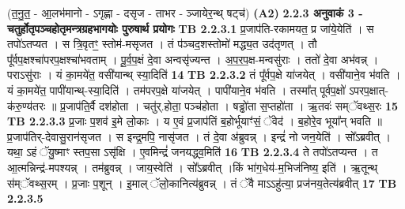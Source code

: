 \documentclass[17pt]{extarticle}
\begin{document}
                  \newline
                                    (त॒नु॒त॒ - आ॒लभ॑मानो - ऽगृह्णा - दसृज - ताभर - ञ्जायेर॒न्थ् षट्च॑) \textbf{(A2)} \newline \newline
                \textbf{ 2.2.3     अनुवाकं   3 - चतुर्होतृपञ्चहोतृमन्त्रग्रहभागयोः पुरुषार्थ प्रयोगः} \newline
                                \textbf{ TB 2.2.3.1} \newline
                  प्र॒जाप॑ति-रकामयत॒ प्र जा॑ये॒येति॑ । स तपो॑ऽतप्यत । स त्रि॒वृतꣳ॒॒ स्तोम॑-मसृजत । तं प॑ञ्चद॒शस्तोमो॑ मद्ध्य॒त उद॑तृणत् । तौ पू᳚र्वप॒क्षश्चा॑परप॒क्षश्चा॑भवताम् । पू॒र्व॒प॒क्षं दे॒वा अन्वसृ॑ज्यन्त । अ॒प॒र॒प॒क्ष-मन्वसु॑राः । ततो॑ दे॒वा अभ॑वन्न् । पराऽसु॑राः । यं का॒मये॑त॒ वसी॑यान्थ् स्या॒दिति॑ \textbf{ 14} \newline
                  \newline
                                \textbf{ TB 2.2.3.2} \newline
                  तं पू᳚र्वप॒क्षे या॑जयेत् । वसी॑याने॒व भ॑वति । यं का॒मये॑त॒ पापी॑यान्थ्-स्या॒दिति॑ । तम॑परप॒क्षे या॑जयेत् । पापी॑याने॒व भ॑वति । तस्मा᳚त् पूर्वप॒क्षो॑ ऽपरप॒क्षात्-क॑रु॒ण्य॑तरः ॥ प्र॒जाप॑ति॒र्वै दश॑होता । चतु॑र्.होता॒ पञ्च॑होता । षड्ढो॑ता स॒प्तहो॑ता । ऋ॒तवः॑ सम्ॅवथ्स॒रः \textbf{ 15} \newline
                  \newline
                                \textbf{ TB 2.2.3.3} \newline
                  प्र॒जाः प॒शव॑ इ॒मे लो॒काः । य ए॒वं प्र॒जाप॑तिं ब॒होर्भूयाꣳ॑सं॒ ॅवेद॑ । ब॒होरे॒व भूया᳚न् भवति ॥ प्र॒जाप॑तिर्-देवासु॒रान॑सृजत । स इन्द्र॒मपि॒ नासृ॑जत । तं दे॒वा अ॑ब्रुवन्न् । इन्द्रं॑ नो जन॒येति॑ । सो᳚ऽब्रवीत् । यथा॒ ऽहं ॅयु॒ष्माꣳ स्तप॒सा ऽसृ॑क्षि । ए॒वमिन्द्रं॑ जनयद्ध्व॒मिति॑ \textbf{ 16} \newline
                  \newline
                                \textbf{ TB 2.2.3.4} \newline
                  ते तपो॑ऽतप्यन्त । त आ॒त्मन्निन्द्र॑-मपश्यन्न् । तम॑ब्रुवन्न् । जाय॒स्वेति॑ । सो᳚ऽब्रवीत् ।किं भा॑ग॒धेय॑-म॒भिज॑निष्य॒ इति॑ । ऋ॒तून्थ् स॑म्ॅवथ्स॒रम् । प्र॒जाः प॒शून् । इ॒माल् ॅलो॒कानित्य॑ब्रुवन्न् । तं ॅवै माऽऽहु॑त्या॒ प्रज॑नय॒तेत्य॑ब्रवीत् \textbf{ 17} \newline
                  \newline
                                \textbf{ TB 2.2.3.5} \newline
\end{document}
